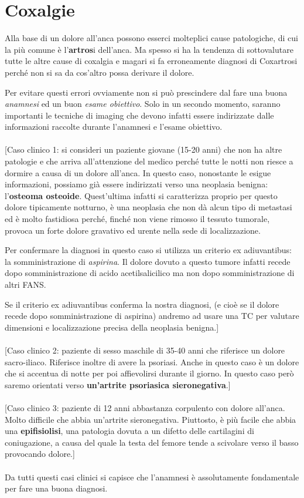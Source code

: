 \section{Coxalgie}

Alla base di un dolore all'anca possono esserci molteplici cause patologiche, di cui la più comune è l'\textbf{artros}i dell'anca. Ma spesso si ha la tendenza di sottovalutare tutte le altre cause di coxalgia e magari si fa erroneamente diagnosi di Coxartrosi perché non si sa da cos'altro possa derivare il dolore.

Per evitare questi errori ovviamente non si può prescindere dal fare una buona \emph{anamnesi} ed un buon \emph{esame obiettivo}. Solo in un secondo momento, saranno importanti le tecniche di imaging che devono infatti essere indirizzate dalle informazioni raccolte durante l'anamnesi e l'esame obiettivo.
\\\\
{[}Caso clinico 1: si consideri un paziente giovane (15-20 anni) che non ha altre patologie e che arriva all'attenzione del medico perché tutte le notti non riesce a dormire a causa di un dolore all'anca. In questo caso, nonostante le esigue informazioni, possiamo già essere indirizzati verso una neoplasia benigna: l'\textbf{osteoma osteoide}. Quest'ultima infatti si caratterizza proprio per questo dolore tipicamente notturno, è una neoplasia che non dà alcun tipo di metastasi ed è molto fastidiosa perché, finché non viene rimosso il tessuto tumorale, provoca un forte dolore gravativo ed urente nella sede di localizzazione.

Per confermare la diagnosi in questo caso si utilizza un criterio ex adiuvantibus: la somministrazione di \emph{aspirina}. Il dolore dovuto a questo tumore infatti recede dopo somministrazione di acido acetilsalicilico ma non dopo somministrazione di altri FANS.

Se il criterio ex adiuvantibus conferma la nostra diagnosi, (e cioè se il dolore recede dopo somministrazione di aspirina) andremo ad usare una TC per valutare dimensioni e localizzazione precisa della neoplasia benigna.{]}
\\\\
{[}Caso clinico 2: paziente di sesso maschile di 35-40 anni che riferisce un dolore sacro-iliaco. Riferisce inoltre di avere la psoriasi. Anche in questo caso è un dolore che si accentua di notte per poi affievolirsi durante il giorno. In questo caso però saremo orientati verso \textbf{un'artrite psoriasica sieronegativa}.{]}
\\\\
{[}Caso clinico 3: paziente di 12 anni abbastanza corpulento con dolore all'anca. Molto difficile che abbia un'artrite sieronegativa. Piuttosto, è più facile che abbia una \textbf{epifisiolisi}, una patologia dovuta a un difetto delle cartilagini di coniugazione, a causa del quale la testa del femore tende a scivolare verso il basso provocando dolore.{]}
\\\\
Da tutti questi casi clinici si capisce che l'anamnesi è assolutamente fondamentale per fare una buona diagnosi.


